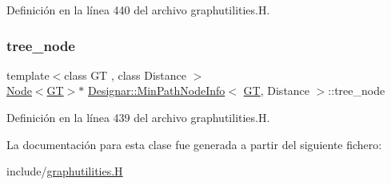 Definición en la línea 440 del archivo graphutilities.\+H.

\mbox{\label{class_designar_1_1_min_path_node_info_a0121695ed8523a60ee92375767a5c169}} 
\subsubsection{\texorpdfstring{tree\+\_\+node}{tree\_node}}
{\footnotesize\ttfamily template$<$class GT , class Distance $>$ \\
\hyperlink{namespace_designar_a5af326c65aa2bd26b26c410f2030d09e}{Node}$<$\hyperlink{demo-buildgraph_8_c_a3001c40d2c31ca87ed96cd7d1334a55e}{GT}$>$$\ast$ \hyperlink{class_designar_1_1_min_path_node_info}{Designar\+::\+Min\+Path\+Node\+Info}$<$ \hyperlink{demo-buildgraph_8_c_a3001c40d2c31ca87ed96cd7d1334a55e}{GT}, Distance $>$\+::tree\+\_\+node}



Definición en la línea 439 del archivo graphutilities.\+H.



La documentación para esta clase fue generada a partir del siguiente fichero\+:\begin{DoxyCompactItemize}
\item 
include/\hyperlink{graphutilities_8_h}{graphutilities.\+H}\end{DoxyCompactItemize}
